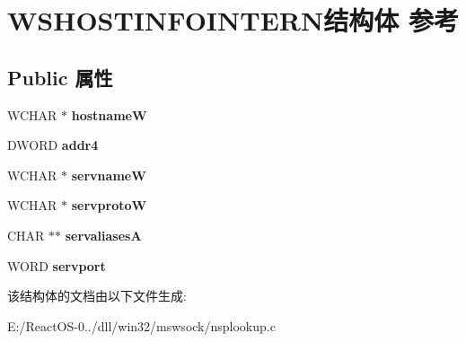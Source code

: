 \hypertarget{struct_w_s_h_o_s_t_i_n_f_o_i_n_t_e_r_n}{}\section{W\+S\+H\+O\+S\+T\+I\+N\+F\+O\+I\+N\+T\+E\+R\+N结构体 参考}
\label{struct_w_s_h_o_s_t_i_n_f_o_i_n_t_e_r_n}
\subsection*{Public 属性}
\begin{DoxyCompactItemize}
\item 
\mbox{\label{struct_w_s_h_o_s_t_i_n_f_o_i_n_t_e_r_n_a8a138175918b991436f9af843fa60bd1}} 
W\+C\+H\+AR $\ast$ {\bfseries hostnameW}
\item 
\mbox{\label{struct_w_s_h_o_s_t_i_n_f_o_i_n_t_e_r_n_ade3097ed2756f7282665a08442ac9fa7}} 
D\+W\+O\+RD {\bfseries addr4}
\item 
\mbox{\label{struct_w_s_h_o_s_t_i_n_f_o_i_n_t_e_r_n_af5cf7687ee58c2c00bd444580d61731d}} 
W\+C\+H\+AR $\ast$ {\bfseries servnameW}
\item 
\mbox{\label{struct_w_s_h_o_s_t_i_n_f_o_i_n_t_e_r_n_a1500e702a1ac5c8cf45c1847c8da8332}} 
W\+C\+H\+AR $\ast$ {\bfseries servprotoW}
\item 
\mbox{\label{struct_w_s_h_o_s_t_i_n_f_o_i_n_t_e_r_n_a38edcda4ee1a1ae072ce11a563bf3da5}} 
C\+H\+AR $\ast$$\ast$ {\bfseries servaliasesA}
\item 
\mbox{\label{struct_w_s_h_o_s_t_i_n_f_o_i_n_t_e_r_n_a9e2408933fcacb5caa97af822229df9f}} 
W\+O\+RD {\bfseries servport}
\end{DoxyCompactItemize}


该结构体的文档由以下文件生成\+:\begin{DoxyCompactItemize}
\item 
E\+:/\+React\+O\+S-\/0../dll/win32/mswsock/nsplookup.\+c\end{DoxyCompactItemize}
